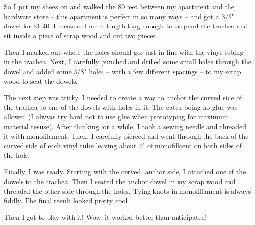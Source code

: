 \documentclass[11pt]{report}
\begin{document}
So I put my shoes on and walked the 80 feet between my apartment and the hardware store -- this apartment is perfect in so many ways -- and got a 3/8" dowel for \$1.40. I measured out a length long enough to suspend the trachea and sit inside a piece of scrap wood and cut two pieces. 

Then I marked out where the holes should go; just in line with the vinyl tubing in the trachea. Next, I carefully punched and drilled some small holes through the dowel and added some 3/8" holes -- with a few different spacings -- to my scrap wood to seat the dowels.


The next step was tricky. I needed to create a way to anchor the curved side of the trachea to one of the dowels with holes in it. The catch being no glue was allowed (I alwyas try hard not to use glue when prototyping for maximum material resuse). After thinking for a while, I took a sewing needle and threaded it with monofilament. Then, I carefully pierced and went through the back of the curved side of each vinyl tube leaving about 4" of monofillaent on both sides of the hole. 

Finally, I was ready. Starting with the curved, anchor side, I attached one of the dowels to the trachea. Then I seated the anchor dowel in my scrap wood and threaded the other side through the holes. Tying knots in monofillament is always fiddly. The final result looked pretty cool 

Then I got to play with it! Wow, it worked better than anticipated!
\end{document}
